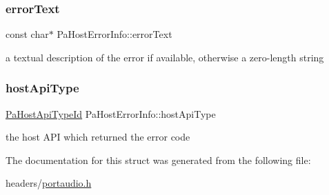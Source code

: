 \subsubsection{\texorpdfstring{error\+Text}{errorText}}
{\footnotesize\ttfamily const char$\ast$ Pa\+Host\+Error\+Info\+::error\+Text}

a textual description of the error if available, otherwise a zero-\/length string \mbox{\label{struct_pa_host_error_info_aeadfc0e22fee75e94541876d6d7a91f7}} 
\subsubsection{\texorpdfstring{host\+Api\+Type}{hostApiType}}
{\footnotesize\ttfamily \hyperlink{portaudio_8h_a8eaebe3d39c5ea45598da8f86dc2e5ae}{Pa\+Host\+Api\+Type\+Id} Pa\+Host\+Error\+Info\+::host\+Api\+Type}

the host A\+PI which returned the error code 

The documentation for this struct was generated from the following file\+:\begin{DoxyCompactItemize}
\item 
headers/\hyperlink{portaudio_8h}{portaudio.\+h}\end{DoxyCompactItemize}
